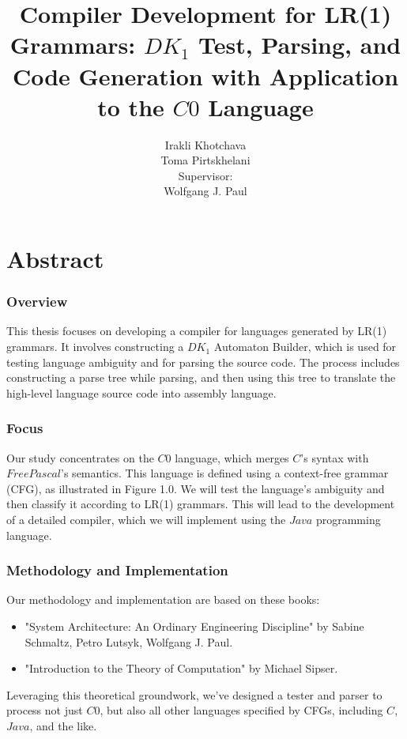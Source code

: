 \documentclass[11pt]{report}
\title{Compiler Development for LR(1) Grammars: \(DK_{1}\) Test, Parsing, and Code Generation with Application to the \(C0\) Language\\ \vspace{10pt}{\Large Kutaisi International University}}
\author{Irakli Khotchava\\Toma Pirtskhelani \vspace{30pt}\\ Supervisor:\\ Wolfgang J. Paul}
\date{}
\begin{document}
    \maketitle

    \chapter*{Abstract}

    \subsection*{Overview}
    This thesis focuses on developing a compiler for languages generated by LR(1) grammars. It involves constructing a \(DK_{1}\) Automaton Builder, which is used for testing language ambiguity and for parsing the source code. The process includes constructing a parse tree while parsing, and then using this tree to translate the high-level language source code into assembly language.

    \subsection*{Focus}
    Our study concentrates on the \(C0\) language, which merges \(C\)'s syntax with \(Free Pascal\)'s semantics. This language is defined using a context-free grammar (CFG), as illustrated in Figure 1.0. We will test the language's ambiguity and then classify it according to LR(1) grammars. This will lead to the development of a detailed compiler, which we will implement using the \(Java\) programming language.

    \subsection*{Methodology and Implementation}
    Our methodology and implementation are based on these books:
    \begin{itemize}
        \item "System Architecture: An Ordinary Engineering Discipline" by Sabine Schmaltz, Petro Lutsyk, Wolfgang J. Paul.
        \item "Introduction to the Theory of Computation"
        by Michael Sipser.
    \end{itemize}
    \setlength{\parindent}{0pt}

    Leveraging this theoretical groundwork, we've designed a tester and parser to process not just \(C0\), but also all other languages specified by CFGs, including \(C\), \(Java\), and the like.
\end{document}
